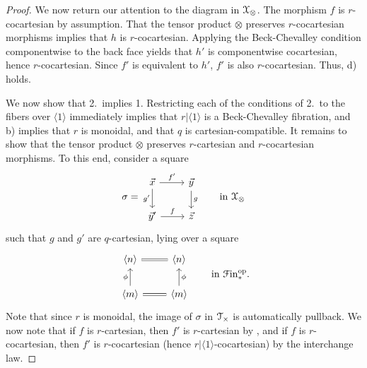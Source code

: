 \documentclass[main.tex]{subfiles}
\begin{document}
\begin{proof}
  We now return our attention to the diagram in $\mathcal{X}_{\otimes}$. The morphism $f$ is $r$-cocartesian by assumption. That the tensor product $\otimes$ preserves $r$-cocartesian morphisms implies that $h$ is $r$-cocartesian. Applying the Beck-Chevalley condition componentwise to the back face yields that $h'$ is componentwise cocartesian, hence $r$-cocartesian. Since $f'$ is equivalent to $h'$, $f'$ is also $r$-cocartesian. Thus, d) holds.

  We now show that 2.\ implies 1. Restricting each of the conditions of 2.\ to the fibers over $\langle 1 \rangle$ immediately implies that $r|\langle 1 \rangle$ is a Beck-Chevalley fibration, and b) implies that $r$ is monoidal, and that $q$ is cartesian-compatible. It remains to show that the tensor product $\otimes$ preserves $r$-cartesian and $r$-cocartesian morphisms. To this end, consider a square
  \begin{equation*}
    \sigma =
    \begin{tikzcd}
      \vec{x}
      \arrow[r, "f'"]
      \arrow[d, swap, "g'"]
      & \vec{y}
      \arrow[d, "g"]
      \\
      \vec{y}'
      \arrow[r, "f"]
      & \vec{z}
    \end{tikzcd}
    \qquad \text{in } \category{X}_{\otimes}
  \end{equation*}
  such that $g$ and $g'$ are $q$-cartesian, lying over a square
  \begin{equation}
    \begin{tikzcd}
      \langle n \rangle
      & \langle n \rangle
      \arrow[l, equals]
      \\
      \langle m \rangle
      \arrow[u, "\phi"]
      & \langle m \rangle
      \arrow[l, equals]
      \arrow[u, swap, "\phi"]
    \end{tikzcd}
    \qquad \text{in } \Finp\op.
  \end{equation}
  Note that since $r$ is monoidal, the image of $\sigma$ in $\mathcal{T}_{\times}$ is automatically pullback. We now note that if $f$ is $r$-cartesian, then $f'$ is $r$-cartesian by \cite[Prop.~2.4.1.7]{highertopostheory}, and if $f$ is $r$-cocartesian, then $f'$ is $r$-cocartesian (hence $r|\langle 1 \rangle$-cocartesian) by the interchange law.
\end{proof}
\end{document}

